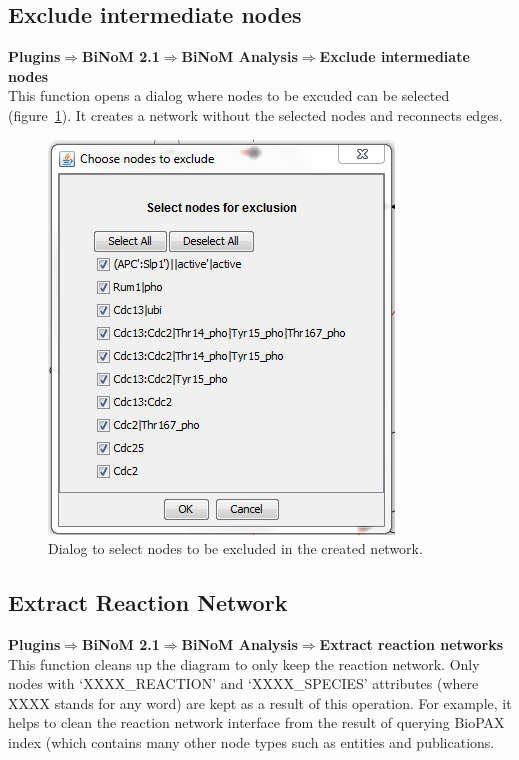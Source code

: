 \subsection{Exclude intermediate nodes}
\textbf{Plugins$\Rightarrow$BiNoM 2.1$\Rightarrow$BiNoM Analysis$\Rightarrow$Exclude intermediate nodes}\\
This function opens a dialog where nodes to be excuded can be selected (figure~\ref{Exclude_nodes_Dialog}). It creates a network without the selected nodes and reconnects edges.
\begin{figure}
\centering
\includegraphics[width=7 cm]{graphics/Exclude_nodes_Dialog}
\caption{Dialog to select nodes to be excluded in the created network.}
\label{Exclude_nodes_Dialog}
\end{figure}

\subsection{Extract Reaction Network}
\textbf{Plugins$\Rightarrow$BiNoM 2.1$\Rightarrow$BiNoM Analysis$\Rightarrow$Extract reaction networks}\\
This function cleans up the diagram to only keep the reaction network. Only nodes with ‘XXXX\_REACTION’ and ‘XXXX\_SPECIES’ attributes (where XXXX stands for any word) are kept as a result of this operation. For example, it helps to clean the reaction network interface from the result of querying BioPAX index (which contains many other node types such as entities and publications.

